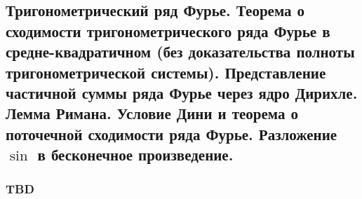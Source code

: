 \subsection{Тригонометрический ряд Фурье. Теорема о сходимости тригонометрического ряда Фурье в средне-квадратичном (без доказательства полноты тригонометрической системы). Представление частичной суммы ряда Фурье через ядро Дирихле. Лемма Римана. Условие Дини и теорема о поточечной сходимости ряда Фурье. Разложение $\sin$ в бесконечное произведение.}

\subsubsection{TBD}